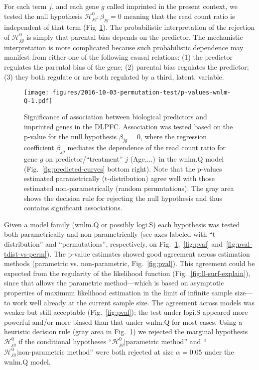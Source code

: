\documentclass[letterpaper]{article}
\begin{document}
For each term \(j\), and each gene \(g\) called imprinted in the present
context, we tested the null hypothesis \(\mathcal{H}^0_{jg} : \beta_{jg} = 0\)
meaning that the read count ratio is independent of that term
(Fig~\ref{fig:pval-wnlm.Q}).  The probabilistic interpretation of the
rejection of \(\mathcal{H}^0_{jg}\) is simply that parental bias depends on
the predictor.  The mechanistic interpretation is more complicated because
such probabilistic dependence may manifest from either one of the following
causal relations: (1) the predictor regulates the parental bias of the gene;
(2) parental bias regulates the predictor; (3) they both regulate or are both
regulated by a third, latent, variable.

\begin{figure}
\begin{center}
\texttt{[image: figures/2016-10-03-permutation-test/p-values-wnlm-Q-1.pdf]}
\end{center}
\caption{
Significance of association between biological predictors and imprinted genes
in the DLPFC.  Association was tested based on the p-value for the null
hypothesis \(\beta_{jg}=0\), where the regression coefficient \(\beta_{jg}\)
mediates the dependence of the read count ratio for gene \(g\) on
predictor/``treatment'' \(j\) (Age,...)~in the wnlm.Q model
(Fig.~\ref{fig:predicted-curves} bottom right).  Note that the p-values
estimated parametrically (t-distribution) agree well with those estimated
non-parametrically (random permutations).  The gray area shows the decision
rule for rejecting the null hypothesis and thus contains significant
associations.
}
\label{fig:pval-wnlm.Q}
\end{figure}

Given a model family (wnlm.Q or possibly logi.S) each hypothesis was tested
both parametrically and non-parametrically (see axes labeled with
``t-distribution'' and ``permutations'', respectively, on
Fig.~\ref{fig:pval-wnlm.Q},~\ref{fig:pval} and~\ref{fig:pval-tdist-vs-perm}).
The p-value estimates showed good agreement across estimation methods
(parametric vs. non-parametric, Fig.~\ref{fig:pval}). This agreement could be
expected from the regularity of the likelihood function
(Fig.~\ref{fig:ll-surf-explain}), since that allows the parametric
method---which is based on asymptotic properties of maximum likelihood
estimation in the limit of infinite sample size---to work well already at the
current sample size. The agreement across models was weaker but still
acceptable (Fig.~\ref{fig:pval}); the test under logi.S appeared more powerful
and/or more biased than that under wnlm.Q for most cases. Using a heuristic
decision rule (gray area in Fig.~\ref{fig:pval-wnlm.Q}) we rejected the
marginal hypothesis \(\mathcal{H}^0_{jg}\) if the conditional hypotheses
``\(\mathcal{H}^0_{jg} |\text{parametric method}\)'' and
``\(\mathcal{H}^0_{jg} |\text{non-parametric method}\)'' were both rejected at
size \(\alpha = 0.05\) under the wnlm.Q model.
\end{document}
